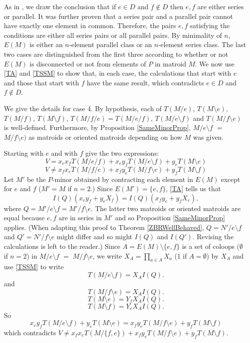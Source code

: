 \documentclass[12pt,leqno]{amsart}
\theoremstyle{remark}
\begin{document}
As in  \cite{Ellis-Monaghan-Traldi}, we draw the conclusion that
if $e\in D$ and $f\not\in D$ then $e, f$ are either series or parallel. 
It was further proven that a series pair and a parallel pair cannot
have exactly one element in common.  Therefore, the pairs $e,f$ satisfying 
the conditions are either all series pairs or all parallel pairs.  By 
minimality of $n$, $E(M)$ is either an $n$-element parallel class or an 
$n$-element series class.  The last two cases are distinguished from
the first three according to whether or not $E(M)$ is disconnected or not
from elements of $P$ in matroid $M$.  We now use \eqref{TA} and \eqref{TSSM}
to show that, in each case, the calculations that start with $e$ and 
those that start with $f$
have the same result, which contradicts $e\in D$ and $f\not\in D$.

We give the details for case 4.  By hypothesis, 
each of $T(M/e)$, $T(M\setminus e)$, $T(M/f)$, $T(M\setminus f)$,
$T(M/f/e)=T(M/e/f)$, $T(M/e\setminus f)$ and 
$T(M/f\setminus e)$ is well-defined.  Furthermore,
by Proposition \ref{SameMinorProp},
$M/e\setminus f$ $=$ 
$M/f\setminus e)$ as matroids or oriented matroids depending
on how $M$ was given.


Starting with $e$ and with $f$ give the two expressions:
\[
V=x_e x_f T(M/e/f) + x_e y_f T(M/e\setminus f) + y_e T(M\setminus e)
\]
\[
V\neq x_f x_e T(M/f/e) + x_f y_e T(M/f\setminus e) + y_f T(M\setminus f)
\]
Let $M'$ be the $P$-minor obtained by contracting each element
in $E(M)$ except for $e$ and $f$ ($M'=M$ if $n=2$.)
Since 
$E(M')=\{e,f\}$,
\eqref{TA} tells us that
\[
I(Q) (x_e y_f + y_e X_f) =
I(Q) (x_f y_e + y_f X_e),
\]
where $Q=M'/e \setminus f=M'/f \setminus e$.  The latter two
matroids or oriented matroids are equal because $e,f$ are in series
in $M'$ and so Proposition \ref{SameMinorProp} applies.
(When adapting this proof to Theorem \ref{ZBRWellBehaved}, 
$Q=N'/e\setminus f$ and $Q'=N'/f\setminus e$ might differ and
so might $I(Q)$ and $I(Q')$.  Revising the calculations is left to the
reader.)
Since $A=E(M)\setminus\{e,f\}$ is a set of coloops ($\emptyset$ if $n=2$)
in
$M/e\setminus f$ $=$ $M/f\setminus e$, we 
write $X_A=\prod_{a\in A}X_a$ ($1$ if $A=\emptyset$)
by $X_A$ and use \eqref{TSSM} to write
\[
T(M/e\setminus f) = X_A I(Q ).
\]
and
\[
T(M/f\setminus e) = X_A I(Q ).
\]
\[
T(M\setminus e) = Y_f X_A I(Q ).
\]
\[
T(M\setminus f) = Y_e X_A I(Q).
\]
So
\[
x_e y_f T(M/e\setminus f) + y_e T(M\setminus e)
=
x_f y_e T(M/f\setminus e) + y_f T(M\setminus f)
\]
which contradicts 
$V\neq x_f x_e T(M/\{f,e\}) + x_f y_e T(M/f\setminus e) + y_f T(M\setminus f)$.
\end{document}
